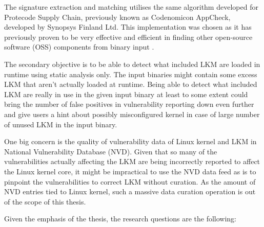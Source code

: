 The signature extraction and matching utilises the same algorithm developed for Protecode Supply
Chain, previously known as Codenomicon AppCheck, developed by Synopsys Finland Ltd. This
implementation was chosen as it has previously proven to be very effective and efficient in finding
other open-source software (OSS) components from binary input \cite{vayrynen2014finding}.

The secondary objective is to be able to detect what included LKM are loaded in runtime using
static analysis only. The input binaries might contain some excess LKM that aren't actually loaded
at runtime. Being able to detect what included LKM are really in use in the given input binary at
least to some extent could bring the number of false positives in vulnerability reporting down even
further and give users a hint about possibly misconfigured kernel in case of large number of unused
LKM in the input binary.

One big concern is the quality of vulnerability data of Linux kernel and LKM in National
Vulnerability Database (NVD). Given that so many of the vulnerabilities actually affecting the LKM
are being incorrectly reported to affect the Linux kernel core, it might be impractical to use the
NVD data feed as is to pinpoint the vulnerabilities to correct LKM without curation. As the amount
of NVD entries tied to Linux kernel, such a massive data curation operation is out of the scope of
this thesis.

Given the emphasis of the thesis, the research questions are the following:

\label{sect:questions}


